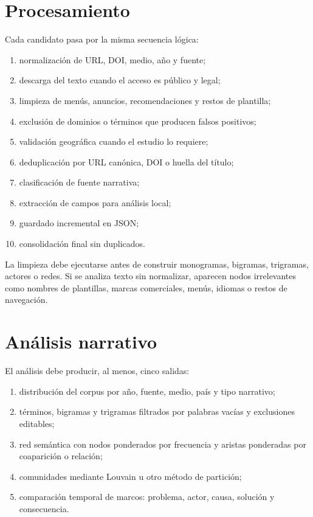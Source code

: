 \documentclass[11pt]{article}
\begin{document}
\section{Procesamiento}

Cada candidato pasa por la misma secuencia lógica:

\begin{enumerate}
    \item normalización de URL, DOI, medio, año y fuente;
    \item descarga del texto cuando el acceso es público y legal;
    \item limpieza de menús, anuncios, recomendaciones y restos de plantilla;
    \item exclusión de dominios o términos que producen falsos positivos;
    \item validación geográfica cuando el estudio lo requiere;
    \item deduplicación por URL canónica, DOI o huella del título;
    \item clasificación de fuente narrativa;
    \item extracción de campos para análisis local;
    \item guardado incremental en JSON;
    \item consolidación final sin duplicados.
\end{enumerate}

La limpieza debe ejecutarse antes de construir monogramas, bigramas, trigramas, actores o redes. Si se analiza texto sin normalizar, aparecen nodos irrelevantes como nombres de plantillas, marcas comerciales, menús, idiomas o restos de navegación.

\section{Análisis narrativo}

El análisis debe producir, al menos, cinco salidas:

\begin{enumerate}
    \item distribución del corpus por año, fuente, medio, país y tipo narrativo;
    \item términos, bigramas y trigramas filtrados por palabras vacías y exclusiones editables;
    \item red semántica con nodos ponderados por frecuencia y aristas ponderadas por coaparición o relación;
    \item comunidades mediante Louvain u otro método de partición;
    \item comparación temporal de marcos: problema, actor, causa, solución y consecuencia.
\end{enumerate}
\end{document}
